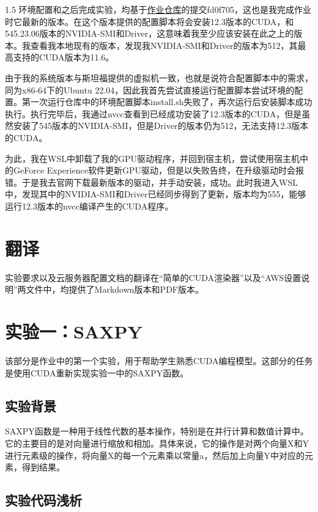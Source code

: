 \documentclass[zihao=-4]{ctexart}
\begin{document}
\begin{spacing}{1.5}
环境配置和之后完成实验，均基于\href{https://github.com/stanford-cs149/asst3}{作业仓库}的提交fd0f705，这也是我完成作业时它最新的版本。在这个版本提供的配置脚本将会安装12.3版本的CUDA，和545.23.06版本的NVIDIA-SMI和Driver，这意味着我至少应该安装在此之上的版本。我查看我本地现有的版本，发现我NVIDIA-SMI和Driver的版本为512，其最高支持的CUDA版本为11.6。

由于我的系统版本与斯坦福提供的虚拟机一致，也就是说符合配置脚本中的需求，同为x86-64下的Ubuntu 22.04，因此我首先尝试直接运行配置脚本尝试环境的配置。第一次运行仓库中的环境配置脚本install.sh失败了，再次运行后安装脚本成功执行。执行完毕后，我通过nvcc查看到已经成功安装了12.3版本的CUDA，但是虽然安装了545版本的NVIDIA-SMI，但是Driver的版本仍为512，无法支持12.3版本的CUDA。

为此，我在WSL中卸载了我的GPU驱动程序，并回到宿主机，尝试使用宿主机中的GeForce Experience软件更新GPU驱动，但是以失败告终，在升级驱动时会报错。于是我去官网下载最新版本的驱动，并手动安装，成功。此时我进入WSL中，发现其中的NVIDIA-SMI和Driver已经同步得到了更新，版本均为555，能够运行12.3版本的nvcc编译产生的CUDA程序。

\section{翻译}

实验要求以及云服务器配置文档的翻译在“简单的CUDA渲染器”以及“AWS设置说明”两文件中，均提供了Markdown版本和PDF版本。

\section{实验一：SAXPY}

该部分是作业中的第一个实验，用于帮助学生熟悉CUDA编程模型。这部分的任务是使用CUDA重新实现实验一中的SAXPY函数。

\subsection{实验背景}

SAXPY函数是一种用于线性代数的基本操作，特别是在并行计算和数值计算中。它的主要目的是对向量进行缩放和相加。具体来说，它的操作是对两个向量X和Y进行元素级的操作，将向量X的每一个元素乘以常量a，然后加上向量Y中对应的元素，得到结果。

\subsection{实验代码浅析}


\end{spacing}
\end{document}
